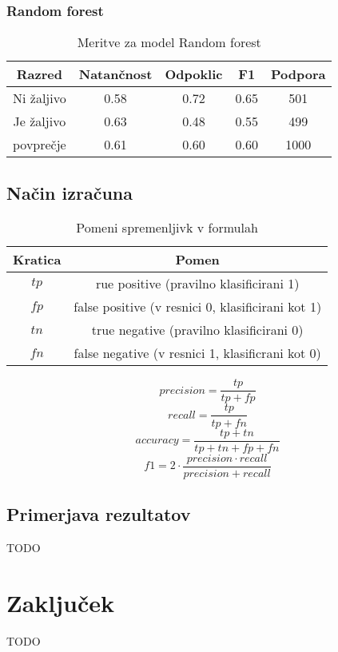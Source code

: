 \documentclass{acm_proc_article-sp}
\begin{document}
\subsubsection{Random forest}
\begin{table}[h!]
	\centering
	\caption{Meritve za model Random forest}
	\begin{tabular}{|c|c|c|c|c|}
		\hline
		\textbf{Razred} & \textbf{Natančnost} & \textbf{Odpoklic} & \textbf{F1} & \textbf{Podpora} \\ \hline
		Ni žaljivo & 0.58 & 0.72 & 0.65 & 501 \\ \hline
		Je žaljivo & 0.63 & 0.48 & 0.55 & 499 \\ \hline \hline
		povprečje & 0.61 & 0.60 & 0.60 & 1000 \\ \hline
	\end{tabular}
\end{table}

\subsection{Način izračuna}
\begin{table}[h!]
	\centering
	\caption{Pomeni spremenljivk v formulah}
	\begin{tabular}{|c|c|} 
		\hline
		\textbf{Kratica} & \textbf{Pomen} \\ \hline
		$ tp $ & rue positive (pravilno klasificirani 1) \\ \hline
		$ fp $ & false positive (v resnici 0, klasificirani kot 1) \\ \hline
		$ tn $ & true negative (pravilno klasificirani 0) \\ \hline
		$ fn $ & false negative (v resnici 1, klasificrani kot 0) \\ \hline		
	\end{tabular}
\end{table}

$$ precision = \frac{tp}{tp + fp} $$
$$ recall = \frac{tp}{tp + fn} $$
$$ accuracy = \frac{tp + tn}{tp + tn + fp + fn} $$
$$ f1 = 2 \cdot \frac{precision \cdot recall}{precision + recall} $$

\subsection{Primerjava rezultatov}
TODO

\section{Zaključek}
TODO


 
\end{document}
